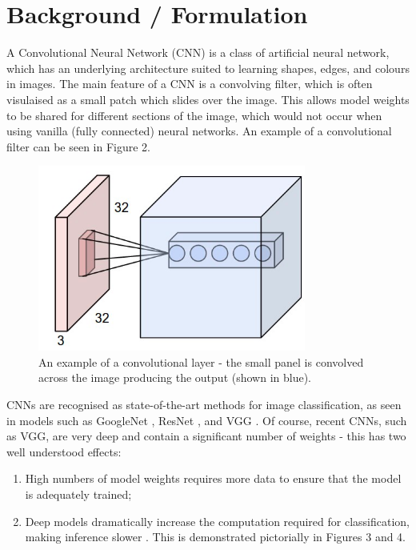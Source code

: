 \documentclass[10pt,journal,compsoc]{IEEEtran}
\begin{document}
		\section{Background / Formulation}
		A Convolutional Neural Network (CNN) is a class of artificial neural network, which has an underlying architecture suited to learning shapes, edges, and colours in images. The main feature of a CNN is a convolving filter, which is often visulaised as a small patch which slides over the image. This allows model weights to be shared for different sections of the image, which would not occur when using vanilla (fully connected) neural networks. An example of a convolutional filter can be seen in Figure 2.\\
		\begin{figure}[h]
			\centering
			\includegraphics[scale=0.35]{CNN}
			\caption{An example of a convolutional layer - the small panel is convolved across the image producing the output (shown in blue).}
		\end{figure}
		
		CNNs are recognised as state-of-the-art methods for image classification, as seen in models such as GoogleNet \cite{Szegedy:2014}, ResNet \cite{He:2015}, and VGG \cite{Simonyan:2015}. Of course, recent CNNs, such as VGG, are very deep and contain a significant number of weights - this has two well understood effects:
		\begin{enumerate}
			\item High numbers of model weights requires more data to ensure that the model is adequately trained;
			\item Deep models dramatically increase the computation required for classification, making inference slower \cite{Cansiani:2017}. This is demonstrated pictorially in Figures 3 and 4.
		\end{enumerate}
		
\end{document}
